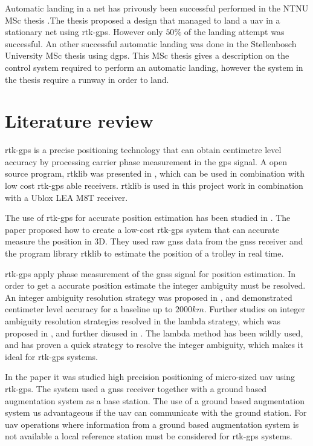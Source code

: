 Automatic landing in a net has privously been successful performed in the NTNU MSc thesis \citep{Skulstad&Syversen}.The thesis proposed a design that managed to land a \gls{uav} in a stationary net using \gls{rtk-gps}. However only $50\%$ of the landing attempt was successful. 
An other successful automatic landing was done in the Stellenbosch University MSc thesis \citep{smit2013autonomous} using \acrfull{dgps}. This MSc thesis gives a description on the control system required to perform an automatic landing, however the system in the thesis require a runway in order to land.


\section{Literature review}
\acrfull{rtk-gps} is a precise positioning technology that can obtain centimetre level accuracy by processing carrier phase measurement in the \gls{gps} signal. A open source program, \gls{rtklib} was presented in \citep{takasu2009development}, which can be used in combination with low cost \gls{rtk-gps} able receivers. \gls{rtklib} is used in this project work in combination with a Ublox LEA M8T receiver.

The use of \gls{rtk-gps} for accurate position estimation has been studied in \citep{3D-RTK}. The paper proposed how to create a low-cost \gls{rtk-gps} system that can accurate measure the position in 3D. They used raw \gls{gnss} data from the \gls{gnss} receiver and the program library \acrfull{rtklib} to estimate the position of a trolley in real time.

\acrfull{rtk-gps} apply phase measurement of the \gls{gnss} signal for position estimation. In order to get a accurate position estimate the integer ambiguity must be resolved. An integer ambiguity resolution strategy was proposed in \citep{GeodeticBaselines}, and demonstrated centimeter level accuracy for a baseline up to $2000km$. Further studies on integer ambiguity resolution strategies resolved in the \gls{lambda} strategy, which was proposed in \citep{Ambiguity:Estimation}, and further disused in \citep{LAMBDA:METHOD,LAMBDAMETHOD}. The \gls{lambda} method has been wildly used, and has proven a quick strategy to resolve the integer ambiguity, which makes it ideal for \gls{rtk-gps} systems. 


In the paper \citep{Low-costRTK} it was studied high precision positioning of micro-sized \gls{uav} using \gls{rtk-gps}. The system used a \gls{gnss} receiver together with a ground based augmentation system as a base station. The use of a ground based augmentation system us advantageous if the \gls{uav} can communicate with the ground station. For \gls{uav} operations where information from a ground based augmentation system is not available a local reference station must be considered for \gls{rtk-gps} systems.

